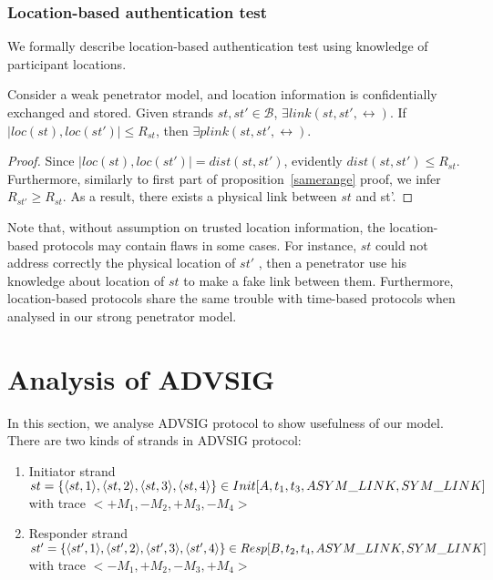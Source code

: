 \subsubsection*{Location-based authentication test}

We formally describe location-based authentication test using knowledge of participant locations. 

\begin{Proposition}
Consider a weak penetrator model, and location information is confidentially exchanged and stored. Given strands $st, st' \in \mathcal{B}$, $\exists link(st,st', \leftrightarrow)$. If $|loc(st),loc(st')| \le R_{st}$, then $\exists plink(st, st',\leftrightarrow)$. 
\end{Proposition}

\begin{proof}

Since $|loc(st),loc(st')| = dist(st,st')$, evidently $dist(st,st') \le R_{st}$. Furthermore, similarly to first part of proposition~\ref{samerange} proof, we infer $R_{st'} \ge R_{st}$. As a result, there exists a physical link between $st$ and st'. 

\end{proof}

Note that, without assumption on trusted location information, the location-based protocols may contain flaws in some cases. For instance, $st$ could not address correctly the physical location of $st'$ , then a penetrator use his knowledge about location of $st$ to make a fake link between them. Furthermore, location-based protocols share the same trouble with time-based protocols when analysed in our strong penetrator model. 


\section{Analysis of ADVSIG}

In this section, we analyse ADVSIG protocol to show usefulness of our model. There are two kinds of strands in ADVSIG protocol:
\begin{enumerate}
\item Initiator strand $st = \{\langle st, 1 \rangle,\langle st, 2 \rangle,\langle st, 3 \rangle,\langle st, 4 \rangle\} \\ \in Init[A,t_1,t_3,ASYM\_LINK, SYM\_LINK]$ with trace $<+M_1, -M_2 , +M_3,-M_4>$
\item Responder strand $st' = \{\langle st', 1 \rangle,\langle st', 2 \rangle,\langle st', 3 \rangle,\langle st', 4 \rangle\} \\ \in Resp[B,t_2,t_4,ASYM\_LINK, SYM\_LINK]$ with trace $<-M_1, +M_2 , -M_3,+M_4>$
\end{enumerate}

